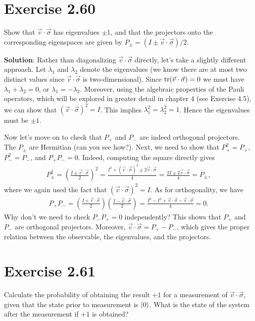 \documentclass{book}
\begin{document}
\section*{Exercise 2.60}
    Show that $\vec{v} \cdot \vec{\sigma}$ has eigenvalues $\pm 1$, and that the projectors onto the corresponding eigenspaces are given by $P_\pm = (I \pm \vec{v} \cdot \vec{\sigma})/2$.

    \textbf{Solution}: Rather than diagonalizing $\vec{v}\cdot \vec{\sigma}$ directly, let's take a slightly different approach. Let $\lambda_1$ and $\lambda_2$ denote the eigenvalues (we know there are at most two distinct values since $\vec{v}\cdot \vec{\sigma}$ is two-dimensional). Since $\tr(\vec{v}\cdot \vec{\sigma}) = 0$ we must have $\lambda_1 + \lambda_2 = 0$, or $\lambda_1 = -\lambda_2$. Moreover, using the algebraic properties of the Pauli operators, which will be explored in greater detail in chapter 4 (see Exercise 4.5), we can show that $(\vec{v}\cdot \vec{\sigma})^2 = I$. This implies $\lambda_1^2 = \lambda_2^2 = 1$. Hence the eigenvalues must be $\pm 1$. 

    Now let's move on to check that $P_+$ and $P_-$ are indeed orthogonal projectors. The $P_{\pm}$ are Hermitian (can you see how?). Next, we need to show that $P_+^2 = P_+$, $P_-^2 = P_-$, and $P_+ P_- = 0$. Indeed, computing the square directly gives
    \begin{align}
        P_{\pm}^2 = \left(\frac{I \pm \vec{v}\cdot \vec{\sigma}}{2}\right)^2 = \frac{I^2 + (\vec{v}\cdot \vec{\sigma})^2 \pm 2 \vec{v}\cdot \vec{\sigma}}{4} = \frac{2 I \pm 2 \vec{v}\cdot \vec{\sigma}}{4} = P_\pm,
    \end{align}
    where we again used the fact that $(\vec{v}\cdot \vec{\sigma})^2 = I$. As for orthogonality, we have
    \begin{align}
        P_+ P_- = \left(\frac{I + \vec{v}\cdot \vec{\sigma}}{2}\right) \left(\frac{I - \vec{v}\cdot \vec{\sigma}}{2}\right) = \frac{I^2 - I^2 + \vec{v}\cdot \vec{\sigma} - \vec{v}\cdot \vec{\sigma}}{4} = 0.
    \end{align}
    Why don't we need to check $P_- P_+ = 0$ independently? This shows that $P_+$ and $P_-$ are orthogonal projectors. Moreover, $\vec{v} \cdot \vec{\sigma} = P_+ - P_-$, which gives the proper relation between the observable, the eigenvalues, and the projectors.

\section*{Exercise 2.61}
    Calculate the probability of obtaining the result $+1$ for a measurement of $\vec{v} \cdot \vec{\sigma}$, given that the state prior to measurement is $\ket{0}$. What is the state of the system after the measurement if $+1$ is obtained?
\end{document}
